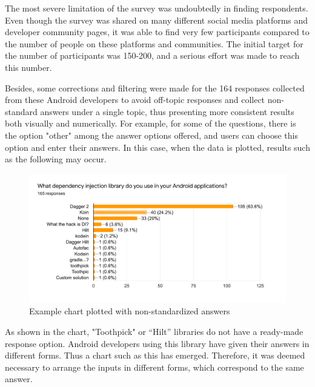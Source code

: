 The most severe limitation of the survey was undoubtedly in finding respondents. Even though the survey was shared on many different social media platforms and developer community pages, it was able to find very few participants compared to the number of people on these platforms and communities. The initial target for the number of participants was 150-200, and a serious effort was made to reach this number.

Besides, some corrections and filtering were made for the 164 responses collected from these Android developers to avoid off-topic responses and collect non-standard answers under a single topic, thus presenting more consistent results both visually and numerically. For example, for some of the questions, there is the option "other" among the answer options offered, and users can choose this option and enter their answers. In this case, when the data is plotted, results such as the following may occur.
\begin{figure}[ht!]
    \centering
    \includegraphics[scale=0.20]{figures/survey_non_standard.png}
    \caption{Example chart plotted with non-standardized answers}
    \label{fig:non_standard_chart_example}
\end{figure}

As shown in the chart, "Toothpick" or “Hilt” libraries do not have a ready-made response option. Android developers using this library have given their answers in different forms. Thus a chart such as this has emerged. Therefore, it was deemed necessary to arrange the inputs in different forms, which correspond to the same answer. 

